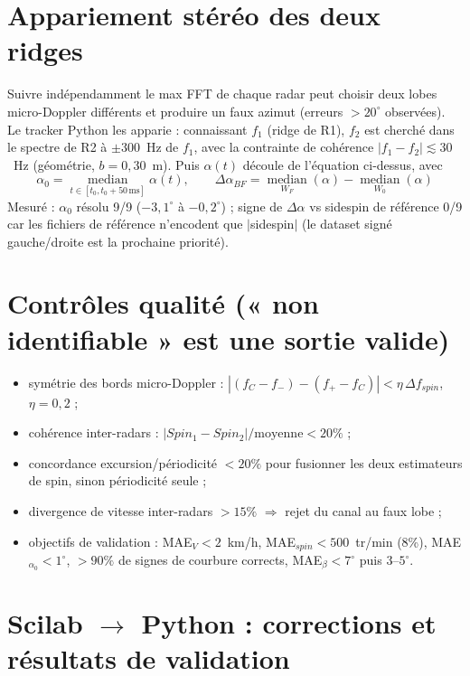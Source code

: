 \documentclass[10pt,a4paper]{report}
\begin{document}
\section{Appariement stéréo des deux ridges}

Suivre indépendamment le max FFT de chaque radar peut choisir deux lobes micro-Doppler différents et produire un faux azimut (erreurs $>20^\circ$ observées). Le tracker Python les apparie : connaissant $f_1$ (ridge de R1), $f_2$ est cherché dans le spectre de R2 à $\pm 300$~Hz de $f_1$, avec la contrainte de cohérence $|f_1-f_2| \lesssim 30$~Hz (géométrie, $b=0{,}30$~m). Puis $\alpha(t)$ découle de l'équation ci-dessus, avec
\begin{equation}
\alpha_0 = \operatorname*{median}_{t\in[t_0,t_0+50\,\text{ms}]}\alpha(t), \qquad
\Delta\alpha_{BF} = \operatorname*{median}_{W_F}(\alpha) - \operatorname*{median}_{W_0}(\alpha)
\end{equation}
Mesuré : $\alpha_0$ résolu 9/9 ($-3{,}1^\circ$ à $-0{,}2^\circ$) ; signe de $\Delta\alpha$ vs sidespin de référence 0/9 car les fichiers de référence n'encodent que $|$sidespin$|$ (le dataset signé gauche/droite est la prochaine priorité).

\section{Contrôles qualité (« non identifiable » est une sortie valide)}
\begin{itemize}
  \item symétrie des bords micro-Doppler : $|(f_C-f_-)-(f_+-f_C)| < \eta\,\Delta f_{spin}$, $\eta=0{,}2$ ;
  \item cohérence inter-radars : $|Spin_1-Spin_2|/\mathrm{moyenne} < 20\%$ ;
  \item concordance excursion/périodicité $<20\%$ pour fusionner les deux estimateurs de spin, sinon périodicité seule ;
  \item divergence de vitesse inter-radars $>15\%$ $\Rightarrow$ rejet du canal au faux lobe ;
  \item objectifs de validation : MAE$_V<2$~km/h, MAE$_{spin}<500$~tr/min (8\%), MAE$_{\alpha_0}<1^\circ$, $>90\%$ de signes de courbure corrects, MAE$_\beta<7^\circ$ puis $3$--$5^\circ$.
\end{itemize}

\section{Scilab $\rightarrow$ Python : corrections et résultats de validation}
\end{document}
